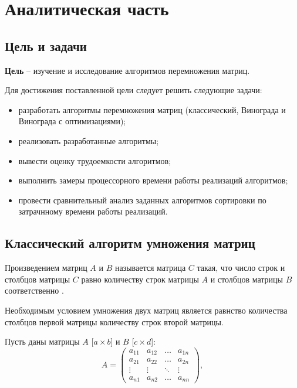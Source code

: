 \chapter{Аналитическая часть}

\section{Цель и задачи}

 \textbf{Цель} -- изучение и исследование алгоритмов перемножения матриц.\newline

Для достижения поставленной цели следует решить следующие задачи:
\begin{itemize}
        \item разработать алгоритмы перемножения матриц (классический, Винограда и Винограда с оптимизациями);
        \item реализовать разработанные алгоритмы;
        \item вывести оценку трудоемкости алгоритмов;
        \item выполнить замеры процессорного времени работы реализаций алгоритмов;
        \item провести сравнительный анализ заданных алгоритмов сортировки по затрачнному времени работы реализаций. \newline
\end{itemize} 

\section{Классический алгоритм умножения матриц}
Произведением матриц $A$ и $B$ называется матрица $C$ такая, что число строк и столбцов матрицы $C$ равно количеству строк матрицы $A$ и столбцов матрицы $B$ соответственно \cite{classic}.

Необходимым условием умножения двух матриц является равнство количества столбцов первой матрицы количеству строк второй матрицы.

Пусть даны матрицы $A$ [$a\times b$] и $B$ [$c\times d$]:
\begin{equation}
A = \left(
\begin{array}{cccc}
a_{11} & a_{12} & \ldots & a_{1n}\\
a_{21} & a_{22} & \ldots & a_{2n}\\
\vdots & \vdots & \ddots & \vdots\\
a_{n1} & a_{n2} & \ldots & a_{nn}
\end{array}
\right),
\end{equation}

